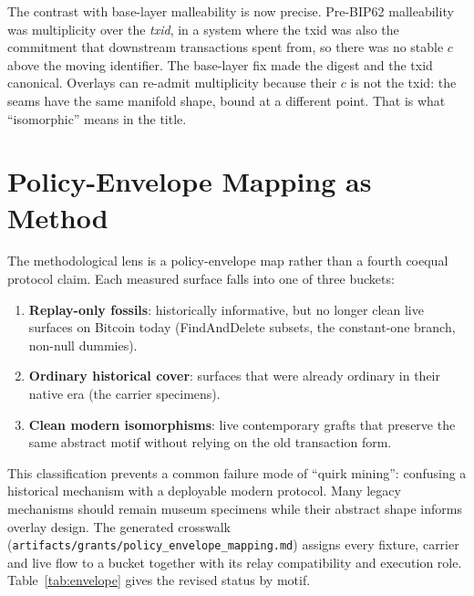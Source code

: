 \documentclass[11pt]{article}
\begin{document}
The contrast with base-layer malleability is now precise. Pre-BIP62
malleability was multiplicity over the \emph{txid}, in a system where the txid
was also the commitment that downstream transactions spent from, so there was
no stable $c$ above the moving identifier. The base-layer fix made the digest
and the txid canonical. Overlays can re-admit multiplicity because their $c$ is
not the txid: the seams have the same manifold shape, bound at a different
point. That is what ``isomorphic'' means in the title.

\section{Policy-Envelope Mapping as Method}
\label{sec:envelope}

The methodological lens is a policy-envelope map rather than a fourth coequal
protocol claim. Each measured surface falls into one of three buckets:

\begin{enumerate}
\item \textbf{Replay-only fossils}: historically informative, but no longer
clean live surfaces on Bitcoin today (FindAndDelete subsets, the constant-one
branch, non-null dummies).
\item \textbf{Ordinary historical cover}: surfaces that were already ordinary
in their native era (the carrier specimens).
\item \textbf{Clean modern isomorphisms}: live contemporary grafts that preserve
the same abstract motif without relying on the old transaction form.
\end{enumerate}

This classification prevents a common failure mode of ``quirk mining'':
confusing a historical mechanism with a deployable modern protocol. Many legacy
mechanisms should remain museum specimens while their abstract shape informs
overlay design. The generated crosswalk
(\texttt{artifacts/grants/policy\_envelope\_mapping.md}) assigns every fixture,
carrier and live flow to a bucket together with its relay compatibility and
execution role. Table~\ref{tab:envelope} gives the revised status by motif.
\end{document}
